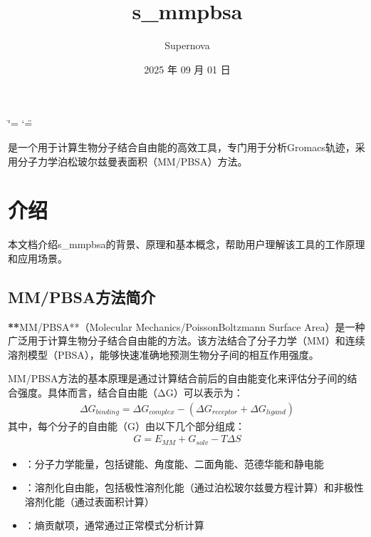 \documentclass[letterpaper,10pt,english]{sphinxmanual}
\title{s\_mmpbsa}
\date{2025 年 09 月 01 日}
\author{Supernova}
\begin{document}
\ifdefined\shorthandoff
  \ifnum\catcode`\=\string=\active\shorthandoff{=}\fi
  \ifnum\catcode`\"=\active{}\fi
\fi

\pagestyle{empty}
\sphinxmaketitle
\pagestyle{plain}
\sphinxtableofcontents
\pagestyle{normal}
\label{\detokenize{index::doc}}


\sphinxAtStartPar
{} 是一个用于计算生物分子结合自由能的高效工具，专门用于分析Gromacs轨迹，采用分子力学泊松\sphinxhyphen{}玻尔兹曼表面积（MM/PB\sphinxhyphen{}SA）方法。

\sphinxstepscope


\chapter{介绍}
\label{\detokenize{introduction:id1}}\label{\detokenize{introduction::doc}}
\sphinxAtStartPar
本文档介绍s\_mmpbsa的背景、原理和基本概念，帮助用户理解该工具的工作原理和应用场景。


\section{MM/PB\sphinxhyphen{}SA方法简介}
\label{\detokenize{introduction:mm-pb-sa}}
\sphinxAtStartPar
{\color{red}\bfseries{}**}MM/PB\sphinxhyphen{}SA**（Molecular Mechanics/Poisson\sphinxhyphen{}Boltzmann Surface Area）是一种广泛用于计算生物分子结合自由能的方法。该方法结合了分子力学（MM）和连续溶剂模型（PB\sphinxhyphen{}SA），能够快速准确地预测生物分子间的相互作用强度。

\sphinxAtStartPar
MM/PB\sphinxhyphen{}SA方法的基本原理是通过计算结合前后的自由能变化来评估分子间的结合强度。具体而言，结合自由能（ΔG）可以表示为：
\begin{equation*}
\begin{split}\Delta G_{binding} = \Delta G_{complex} - (\Delta G_{receptor} + \Delta G_{ligand})\end{split}
\end{equation*}
\sphinxAtStartPar
其中，每个分子的自由能（G）由以下几个部分组成：
\begin{equation*}
\begin{split}G = E_{MM} + G_{solv} - T\Delta S\end{split}
\end{equation*}\begin{itemize}
\item {} 
\sphinxAtStartPar
{}：分子力学能量，包括键能、角度能、二面角能、范德华能和静电能

\item {} 
\sphinxAtStartPar
{}：溶剂化自由能，包括极性溶剂化能（通过泊松\sphinxhyphen{}玻尔兹曼方程计算）和非极性溶剂化能（通过表面积计算）

\item {} 
\sphinxAtStartPar
{}：熵贡献项，通常通过正常模式分析计算

\end{itemize}
\end{document}
